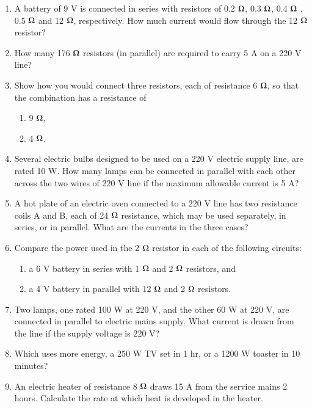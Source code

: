 \begin{enumerate}[label=\arabic*.,ref=\thesubsection.\theenumi]
\item  A battery of 9 V is connected in series with resistors of 0.2 $\ohm$, 0.3 $\ohm$, 0.4 $\ohm$ , 0.5 $\ohm$ and 12 $\ohm$, respectively. How much current would flow through the 12 $\ohm$ resistor?
\item  How many 176 $\ohm$ resistors (in parallel) are required to carry 5 A on a 220 V line? 
\item  Show how you would connect three resistors, each of resistance 6 $\ohm$, so that the combination has a resistance of \begin{enumerate} \item  9 $\ohm$, \item 4 $\ohm$.\end{enumerate}
\item  Several electric bulbs designed to be used on a 220 V electric supply line, are rated 10 W. How many lamps can be connected in parallel with each other across the two wires of 220 V line if the maximum allowable current is 5 A?
\item  A hot plate of an electric oven connected to a 220 V line has two resistance coils A and B, each of 24 $\ohm$ resistance, which may be used separately, in series, or in parallel. What are the currents in the three cases?
\item  Compare the power used in the 2 $\ohm$ resistor in each of the following circuits: \begin{enumerate} \item  a 6 V battery in series with 1 $\ohm$ and 2 $\ohm$ resistors, and \item a 4 V battery in parallel with 12 $\ohm$ and 2 $\ohm$ resistors.\end{enumerate}
\item Two lamps, one rated 100 W at 220 V, and the other 60 W at 220 V, are connected in parallel to electric mains supply. What current is drawn from the line if the supply voltage is 220 V?
\item Which uses more energy, a 250 W TV set in 1 hr, or a 1200 W toaster in 10 minutes? 
\item  An electric heater of resistance 8 $\ohm$ draws 15 A from the service mains 2 hours. Calculate the rate at which heat is developed in the heater.
\end{enumerate}
%
